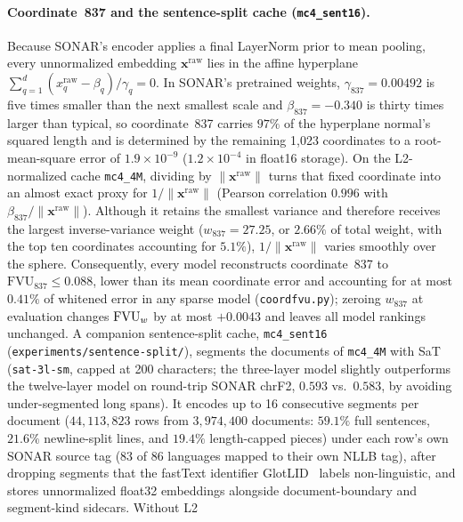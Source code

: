 \paragraph{Coordinate~837 and the sentence-split cache (\texttt{mc4\_sent16}).}
Because SONAR's encoder applies a final LayerNorm prior to mean pooling,
every unnormalized embedding $\mathbf{x}^{\mathrm{raw}}$ lies in the affine
hyperplane $\sum_{q=1}^{d} (x^{\mathrm{raw}}_q - \beta_q)/\gamma_q = 0$.
In SONAR's pretrained weights, $\gamma_{837} = 0.00492$ is five times
smaller than the next smallest scale and $\beta_{837} = -0.340$ is thirty
times larger than typical, so coordinate~837 carries $97\%$ of the
hyperplane normal's squared length and is determined by the remaining
1{,}023 coordinates to a root-mean-square error of $1.9\times10^{-9}$
($1.2\times10^{-4}$ in float16 storage). On the L2-normalized cache
\texttt{mc4\_4M}, dividing by $\lVert\mathbf{x}^{\mathrm{raw}}\rVert$ turns
that fixed coordinate into an almost exact proxy for
$1/\lVert\mathbf{x}^{\mathrm{raw}}\rVert$ (Pearson correlation $0.996$ with
$\beta_{837}/\lVert\mathbf{x}^{\mathrm{raw}}\rVert$). Although it retains
the smallest variance and therefore receives the largest inverse-variance
weight ($w_{837} = 27.25$, or $2.66\%$ of total weight, with the top ten
coordinates accounting for $5.1\%$), $1/\lVert\mathbf{x}^{\mathrm{raw}}\rVert$
varies smoothly over the sphere. Consequently, every model reconstructs
coordinate~837 to $\mathrm{FVU}_{837} \le 0.088$, lower than its mean
coordinate error and accounting for at most $0.41\%$ of whitened error in
any sparse model (\texttt{coordfvu.py}); zeroing $w_{837}$ at evaluation
changes $\mathrm{FVU}_w$ by at most $+0.0043$ and leaves all model rankings unchanged.
A companion sentence-split cache, \texttt{mc4\_sent16}
(\texttt{experiments/\allowbreak sentence-split/}), segments the
documents of \texttt{mc4\_4M} with SaT~\cite{frohmann2024sat} (\texttt{sat-3l-sm}, capped at 200
characters; the three-layer model slightly outperforms the twelve-layer
model on round-trip SONAR chrF2, $0.593$ vs.\ $0.583$, by avoiding
under-segmented long spans). It encodes up to 16 consecutive segments per
document ($44{,}113{,}823$ rows from $3{,}974{,}400$ documents: $59.1\%$
full sentences, $21.6\%$ newline-split lines, and $19.4\%$ length-capped
pieces) under each row's own SONAR source tag (83 of 86 languages
mapped to their own NLLB tag), after dropping segments that the fastText
identifier GlotLID~\cite{kargaran2023} labels non-linguistic, and stores
unnormalized float32 embeddings
alongside document-boundary and segment-kind sidecars. Without L2
